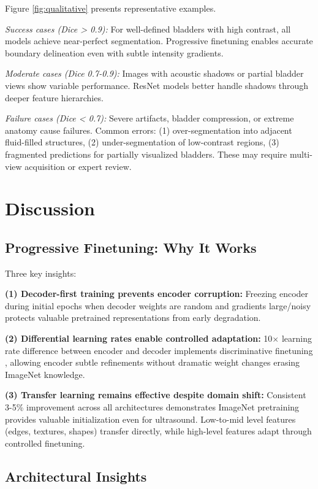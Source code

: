 \documentclass{article}
\begin{document}
Figure \ref{fig:qualitative} presents representative examples.

\textit{Success cases (Dice > 0.9):} For well-defined bladders with high contrast, all models achieve near-perfect segmentation. Progressive finetuning enables accurate boundary delineation even with subtle intensity gradients.

\textit{Moderate cases (Dice 0.7-0.9):} Images with acoustic shadows or partial bladder views show variable performance. ResNet models better handle shadows through deeper feature hierarchies.

\textit{Failure cases (Dice < 0.7):} Severe artifacts, bladder compression, or extreme anatomy cause failures. Common errors: (1) over-segmentation into adjacent fluid-filled structures, (2) under-segmentation of low-contrast regions, (3) fragmented predictions for partially visualized bladders. These may require multi-view acquisition or expert review.

\section{Discussion}
\label{sec:discussion}

\subsection{Progressive Finetuning: Why It Works}

Three key insights:

\textbf{(1) Decoder-first training prevents encoder corruption:} Freezing encoder during initial epochs when decoder weights are random and gradients large/noisy protects valuable pretrained representations from early degradation.

\textbf{(2) Differential learning rates enable controlled adaptation:} 10$\times$ learning rate difference between encoder and decoder implements discriminative finetuning \cite{howard2018universal}, allowing encoder subtle refinements without dramatic weight changes erasing ImageNet knowledge.

\textbf{(3) Transfer learning remains effective despite domain shift:} Consistent 3-5\% improvement across all architectures demonstrates ImageNet pretraining provides valuable initialization even for ultrasound. Low-to-mid level features (edges, textures, shapes) transfer directly, while high-level features adapt through controlled finetuning.

\subsection{Architectural Insights}
\end{document}
